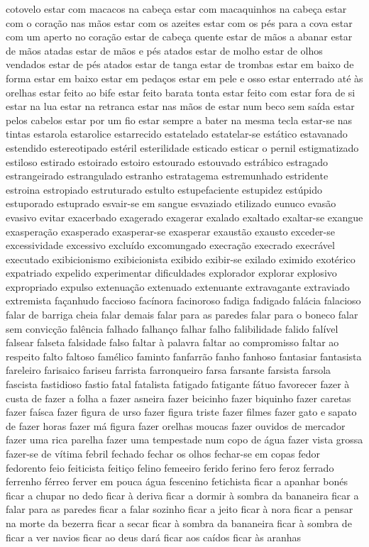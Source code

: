 cotovelo estar com macacos na cabe\c{c}a estar com macaquinhos na cabe\c{c}a estar com o cora\c{c}\~ao nas m\~aos estar com os azeites estar com os p\'{e}s para a cova estar com um aperto no cora\c{c}\~ao estar de cabe\c{c}a quente estar de m\~aos a abanar estar de m\~aos atadas estar de m\~aos e p\'{e}s atados estar de molho estar de olhos vendados estar de p\'{e}s atados estar de tanga estar de trombas estar em baixo de forma estar em baixo estar em peda\c{c}os estar em pele e osso estar enterrado at\'{e} \`{a}s orelhas estar feito ao bife estar feito barata tonta estar feito com estar fora de si estar na lua estar na retranca estar nas m\~aos de estar num beco sem sa\'{i}da estar pelos cabelos estar por um fio estar sempre a bater na mesma tecla estar-se nas tintas estarola estarolice estarrecido estatelado estatelar-se est\'{a}tico estavanado estendido estereotipado est\'{e}ril esterilidade esticado esticar o pernil estigmatizado estiloso estirado estoirado estoiro estourado estouvado estr\'{a}bico estragado estrangeirado estrangulado estranho estratagema estremunhado estridente estroina estropiado estruturado estulto estupefaciente estupidez est\'{u}pido estuporado estuprado esvair-se em sangue esvaziado etilizado eunuco evas\~ao evasivo evitar exacerbado exagerado exagerar exalado exaltado exaltar-se exangue exaspera\c{c}\~ao exasperado exasperar-se exasperar exaust\~ao exausto exceder-se excessividade excessivo exclu\'{i}do excomungado execra\c{c}\~ao execrado execr\'{a}vel executado exibicionismo exibicionista exibido exibir-se exilado eximido exot\'{e}rico expatriado expelido experimentar dificuldades explorador explorar explosivo expropriado expulso extenua\c{c}\~ao extenuado extenuante extravagante extraviado extremista fa\c{c}anhudo faccioso fac\'{i}nora facinoroso fadiga fadigado fal\'{a}cia falacioso falar de barriga cheia falar demais falar para as paredes falar para o boneco falar sem convic\c{c}\~ao fal\^{e}ncia falhado falhan\c{c}o falhar falho falibilidade falido fal\'{i}vel falsear falseta falsidade falso faltar \`{a} palavra faltar ao compromisso faltar ao respeito falto faltoso fam\'{e}lico faminto fanfarr\~ao fanho fanhoso fantasiar fantasista fareleiro farisaico fariseu farrista farronqueiro farsa farsante farsista farsola fascista fastidioso fastio fatal fatalista fatigado fatigante f\'{a}tuo favorecer fazer \`{a} custa de fazer a folha a fazer asneira fazer beicinho fazer biquinho fazer caretas fazer fa\'{i}sca fazer figura de urso fazer figura triste fazer filmes fazer gato e sapato de fazer horas fazer m\'{a} figura fazer orelhas moucas fazer ouvidos de mercador fazer uma rica parelha fazer uma tempestade num copo de \'{a}gua fazer vista grossa fazer-se de v\'{i}tima febril fechado fechar os olhos fechar-se em copas fedor fedorento feio feiticista feiti\c{c}o felino femeeiro ferido ferino fero feroz ferrado ferrenho f\'{e}rreo ferver em pouca \'{a}gua fescenino fetichista ficar a apanhar bon\'{e}s ficar a chupar no dedo ficar \`{a} deriva ficar a dormir \`{a} sombra da bananeira ficar a falar para as paredes ficar a falar sozinho ficar a jeito ficar \`{a} nora ficar a pensar na morte da bezerra ficar a secar ficar \`{a} sombra da bananeira ficar \`{a} sombra de ficar a ver navios ficar ao deus dar\'{a} ficar aos ca\'{i}dos ficar \`{a}s aranhas 